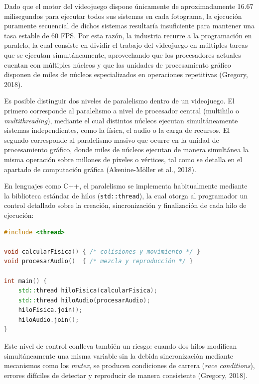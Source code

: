 \documentclass[12pt]{report}
\begin{document}

Dado que el motor del videojuego dispone únicamente de aproximadamente 16.67 milisegundos para ejecutar todos sus sistemas en cada fotograma, la ejecución puramente secuencial de dichos sistemas resultaría insuficiente para mantener una tasa estable de 60 FPS. Por esta razón, la industria recurre a la programación en paralelo, la cual consiste en dividir el trabajo del videojuego en múltiples tareas que se ejecutan simultáneamente, aprovechando que los procesadores actuales cuentan con múltiples núcleos y que las unidades de procesamiento gráfico disponen de miles de núcleos especializados en operaciones repetitivas (Gregory, 2018).

Es posible distinguir dos niveles de paralelismo dentro de un videojuego. El primero corresponde al paralelismo a nivel de procesador central (multihilo o \textit{multithreading}), mediante el cual distintos núcleos ejecutan simultáneamente sistemas independientes, como la física, el audio o la carga de recursos. El segundo corresponde al paralelismo masivo que ocurre en la unidad de procesamiento gráfico, donde miles de núcleos ejecutan de manera simultánea la misma operación sobre millones de píxeles o vértices, tal como se detalla en el apartado de computación gráfica (Akenine-Möller et al., 2018).

En lenguajes como C++, el paralelismo se implementa habitualmente mediante la biblioteca estándar de hilos (\texttt{std::thread}), la cual otorga al programador un control detallado sobre la creación, sincronización y finalización de cada hilo de ejecución:

\begin{lstlisting}[language=C++]
#include <thread>

void calcularFisica() { /* colisiones y movimiento */ }
void procesarAudio()  { /* mezcla y reproducción */ }

int main() {
    std::thread hiloFisica(calcularFisica);
    std::thread hiloAudio(procesarAudio);
    hiloFisica.join();
    hiloAudio.join();
}
\end{lstlisting}

Este nivel de control conlleva también un riesgo: cuando dos hilos modifican simultáneamente una misma variable sin la debida sincronización mediante mecanismos como los \textit{mutex}, se producen condiciones de carrera (\textit{race conditions}), errores difíciles de detectar y reproducir de manera consistente (Gregory, 2018).
\end{document}
